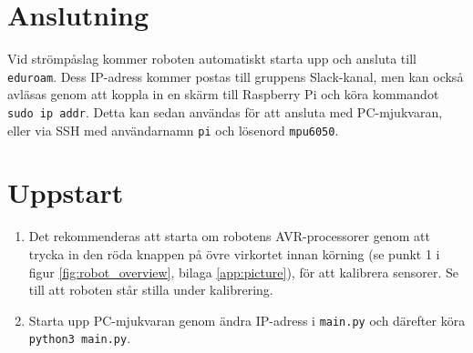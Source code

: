 \documentclass[a4paper,11pt]{article}
\begin{document}
\pagestyle{intro}
\LIPStitelsida
\clearpage
\begin{LIPSprojektidentitet}
\end{LIPSprojektidentitet}

\clearpage
\renewcommand{\familydefault}{\sfdefault}	%
\normalfont
\tableofcontents
\renewcommand{\familydefault}{\rmdefault}	%
\normalfont
\clearpage
\begin{LIPSdokumenthistorik}
\end{LIPSdokumenthistorik}
\clearpage
\setcounter{page}{1}
\pagestyle{content}

\section{Anslutning}
Vid strömpåslag kommer roboten automatiskt starta upp och ansluta till \texttt{eduroam}. Dess IP-adress kommer postas till gruppens Slack-kanal, men kan också avläsas genom att koppla in en skärm till Raspberry Pi och köra kommandot \texttt{sudo ip addr}. Detta kan sedan användas för att ansluta med PC-mjukvaran, eller via SSH med användarnamn \texttt{pi} och lösenord \texttt{mpu6050}.

\section{Uppstart}
\begin{enumerate}
    \item Det rekommenderas att starta om robotens AVR-processorer genom att trycka in den röda knappen på övre virkortet innan körning (se punkt 1 i figur \ref{fig:robot_overview}, bilaga \ref{app:picture}), för att kalibrera sensorer. Se till att roboten står stilla under kalibrering.
    
    \item Starta upp PC-mjukvaran genom ändra IP-adress i \texttt{main.py} och därefter köra \texttt{python3 main.py}. 
\end{enumerate}
\end{document}
